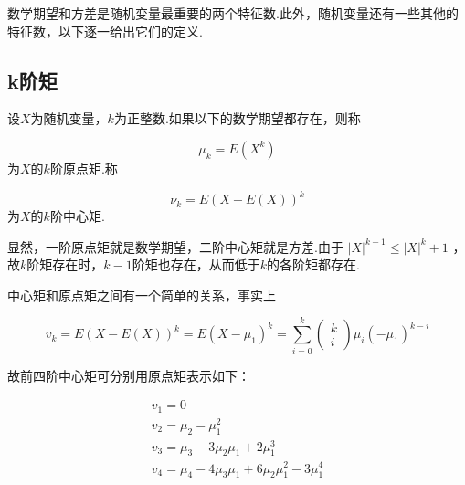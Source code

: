 数学期望和方差是随机变量最重要的两个特征数.此外，随机变量还有一些其他的特征数，以下逐一给出它们的定义.

\subsection{k阶矩}

\begin{definition}{}{}
	设$ X $为随机变量，$ k $为正整数.如果以下的数学期望都存在，则称
	
	\begin{equation}
	\mu_{k}=E\left(X^{k}\right) \label{eq:2.7.1}
	\end{equation}
	为$ X $的$ k $阶原点矩.称
	
	\begin{equation}
	\nu_{k}=E(X-E(X))^{k} \label{eq:2.7.2}
	\end{equation}
	为$ X $的$ k $阶中心矩.
\end{definition}


显然，一阶原点矩就是数学期望，二阶中心矩就是方差.由于 $|X|^{k-1} \leqslant |X|^{k}+1 $ ，故$ k $阶矩存在时，$ k-1 $阶矩也存在，从而低于$ k $的各阶矩都存在.

中心矩和原点矩之间有一个简单的关系，事实上

\[
v_{k}=E(X-E(X))^{k}=E\left(X-\mu_{1}\right)^{k}=\sum_{i=0}^{k} \left( \begin{array}{l}{k} \\ {i}\end{array}\right) \mu_{i}\left(-\mu_{1}\right)^{k-i}
\]

故前四阶中心矩可分别用原点矩表示如下：

\[
\begin{array}{l}{v_{1}=0} \\ {v_{2}=\mu_{2}-\mu_{1}^{2}} \\ {v_{3}=\mu_{3}-3 \mu_{2} \mu_{1}+2 \mu_{1}^{3}} \\ {v_{4}=\mu_{4}-4 \mu_{3} \mu_{1}+6 \mu_{2} \mu_{1}^{2}-3 \mu_{1}^{4}}\end{array}
\]


